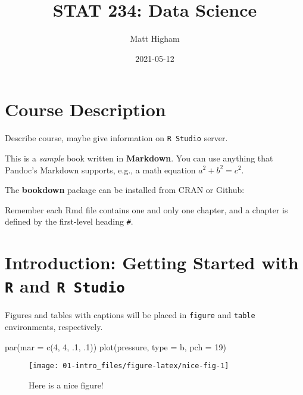 \documentclass[
]{book}
\title{STAT 234: Data Science}
\author{Matt Higham}
\date{2021-05-12}
\newenvironment{Shaded}{\begin{snugshade}}{\end{snugshade}}
\newcommand{\AttributeTok}[1]{\textcolor[rgb]{0.77,0.63,0.00}{#1}}
\newcommand{\DecValTok}[1]{\textcolor[rgb]{0.00,0.00,0.81}{#1}}
\newcommand{\FunctionTok}[1]{\textcolor[rgb]{0.00,0.00,0.00}{#1}}
\newcommand{\NormalTok}[1]{#1}
\newcommand{\StringTok}[1]{\textcolor[rgb]{0.31,0.60,0.02}{#1}}
\begin{document}
\maketitle

{
\setcounter{tocdepth}{1}
\tableofcontents
}
\hypertarget{course-description}{%
\chapter{Course Description}\label{course-description}}

Describe course, maybe give information on \texttt{R\ Studio} server.

This is a \emph{sample} book written in \textbf{Markdown}. You can use anything that Pandoc's Markdown supports, e.g., a math equation \(a^2 + b^2 = c^2\).

The \textbf{bookdown} package can be installed from CRAN or Github:

Remember each Rmd file contains one and only one chapter, and a chapter is defined by the first-level heading \texttt{\#}.

\hypertarget{intro}{%
\chapter{\texorpdfstring{Introduction: Getting Started with \texttt{R} and \texttt{R\ Studio}}{Introduction: Getting Started with R and R Studio}}\label{intro}}

Figures and tables with captions will be placed in \texttt{figure} and \texttt{table} environments, respectively.

\begin{Shaded}
\begin{Highlighting}[]
\FunctionTok{par}\NormalTok{(}\AttributeTok{mar =} \FunctionTok{c}\NormalTok{(}\DecValTok{4}\NormalTok{, }\DecValTok{4}\NormalTok{, .}\DecValTok{1}\NormalTok{, .}\DecValTok{1}\NormalTok{))}
\FunctionTok{plot}\NormalTok{(pressure, }\AttributeTok{type =} \StringTok{\textquotesingle{}b\textquotesingle{}}\NormalTok{, }\AttributeTok{pch =} \DecValTok{19}\NormalTok{)}
\end{Highlighting}
\end{Shaded}

\begin{figure}

{\centering \texttt{[image: 01-intro\_files/figure-latex/nice-fig-1]} 

}

\caption{Here is a nice figure!}\label{fig:nice-fig}
\end{figure}
\end{document}
